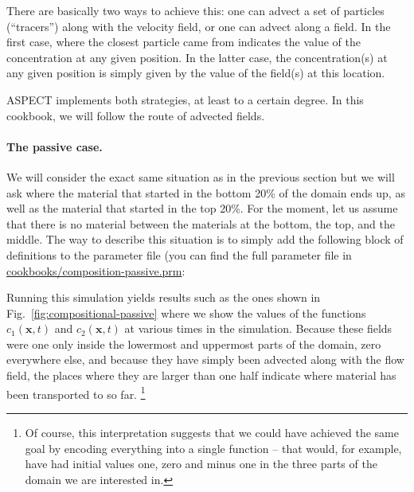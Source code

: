 \documentclass{article}
\newcommand{\aspect}{\textsc{ASPECT}}
\begin{document}
There are basically two ways to achieve this: one can advect a set of
particles (``tracers'') along with the velocity field, or one can advect along a
field. In the first case, where the closest particle came from indicates the
value of the concentration at any given position. In the latter case, the
concentration(s) at any given position is simply given by the value of the
field(s) at this location.

\aspect{} implements both strategies, at least to a certain degree. In this
cookbook, we will follow the route of advected fields.

\paragraph{The passive case.}
We will consider the
exact same situation as in the previous section but we will ask where the
material that started in the bottom 20\% of the domain
ends up, as well as the material that started in the top 20\%. For the moment,
let us assume that there is no material between the materials at the bottom, the
top, and the middle. The way to describe this situation is to simply add the
following block of definitions to the parameter file (you can find the full
parameter file in \url{cookbooks/composition-passive.prm}:



Running this simulation yields results such as the ones shown in
Fig.~\ref{fig:compositional-passive} where we show the values of the functions
$c_1(\mathbf x,t)$ and $c_2(\mathbf x,t)$ at various times in the simulation.
Because these fields were one only inside the lowermost and uppermost parts of
the domain, zero everywhere else, and because they have simply been advected
along with the flow field, the places where they are larger than one half
indicate where material has been transported to so far.%
\footnote{Of course, this interpretation suggests that we could have achieved
the same goal by encoding everything into a single function -- that would, for
example, have had initial values one, zero and minus one in the three parts of
the domain we are interested in.}
\end{document}
